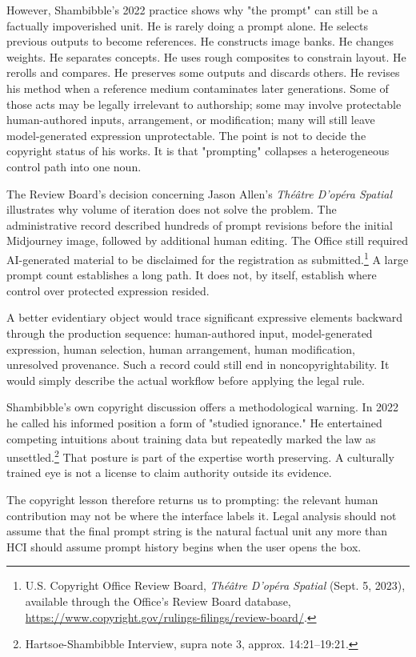 \documentclass[11pt]{article}
\begin{document}
However, Shambibble's 2022 practice shows why "the prompt" can still be a factually impoverished unit. He is rarely doing a prompt alone. He selects previous outputs to become references. He constructs image banks. He changes weights. He separates concepts. He uses rough composites to constrain layout. He rerolls and compares. He preserves some outputs and discards others. He revises his method when a reference medium contaminates later generations. Some of those acts may be legally irrelevant to authorship; some may involve protectable human-authored inputs, arrangement, or modification; many will still leave model-generated expression unprotectable. The point is not to decide the copyright status of his works. It is that "prompting" collapses a heterogeneous control path into one noun.

The Review Board's decision concerning Jason Allen's \textit{Th\'e\^atre D'op\'era Spatial} illustrates why volume of iteration does not solve the problem. The administrative record described hundreds of prompt revisions before the initial Midjourney image, followed by additional human editing. The Office still required AI-generated material to be disclaimed for the registration as submitted.\footnote{U.S. Copyright Office Review Board, \textit{Th\'e\^atre D'op\'era Spatial} (Sept. 5, 2023), available through the Office's Review Board database, \url{https://www.copyright.gov/rulings-filings/review-board/}.} A large prompt count establishes a long path. It does not, by itself, establish where control over protected expression resided.

A better evidentiary object would trace significant expressive elements backward through the production sequence: human-authored input, model-generated expression, human selection, human arrangement, human modification, unresolved provenance. Such a record could still end in noncopyrightability. It would simply describe the actual workflow before applying the legal rule.

Shambibble's own copyright discussion offers a methodological warning. In 2022 he called his informed position a form of "studied ignorance." He entertained competing intuitions about training data but repeatedly marked the law as unsettled.\footnote{Hartsoe-Shambibble Interview, supra note 3, approx. 14:21--19:21.} That posture is part of the expertise worth preserving. A culturally trained eye is not a license to claim authority outside its evidence.

The copyright lesson therefore returns us to prompting: the relevant human contribution may not be where the interface labels it. Legal analysis should not assume that the final prompt string is the natural factual unit any more than HCI should assume prompt history begins when the user opens the box.
\end{document}
